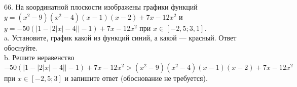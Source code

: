 66. На координатной плоскости изображены графики функций $y=(x^2-9)(x^2-4)(x-1)(x-2)+7x-12x^2$ и $y=-50(|1-|2|x|-4||-1)+7x-12x^2$ при
$x\in[-2,5;3,1].$\\
a. Установите, график какой из функций синий, а какой --- красный. Ответ обоснуйте.\\
b. Решите неравенство  $-50(|1-|2|x|-4||-1)+7x-12x^2 >(x^2-9)(x^2-4)(x-1)(x-2)+7x-12x^2$ при
$x\in[-2,5;3]$ и запишите ответ (обоснование не требуется).
\begin{center}\end{center}
